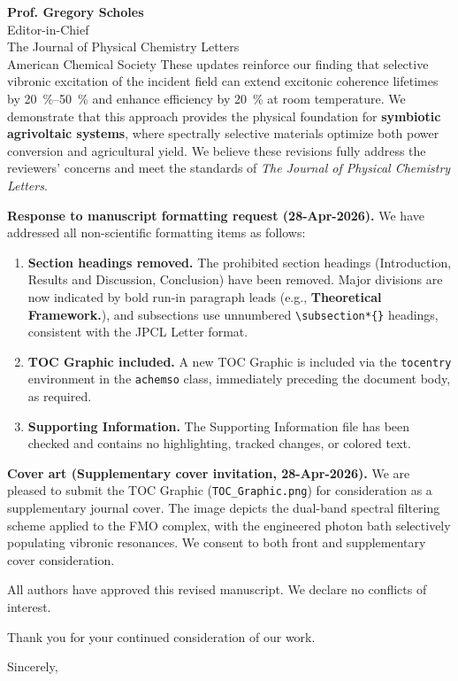 \documentclass[11pt,a4paper]{letter}
\begin{document}
\begin{letter}{
\textbf{Prof. Gregory Scholes}\\
Editor-in-Chief\\
The Journal of Physical Chemistry Letters\\
American Chemical Society
}
These updates reinforce our finding that selective vibronic excitation of the incident field can extend excitonic coherence lifetimes by \SIrange{20}{50}{\percent} and enhance efficiency by \SI{20}{\percent} at room temperature. We demonstrate that this approach provides the physical foundation for \textbf{symbiotic agrivoltaic systems}, where spectrally selective materials optimize both power conversion and agricultural yield. We believe these revisions fully address the reviewers' concerns and meet the standards of \textit{The Journal of Physical Chemistry Letters}.

\textbf{Response to manuscript formatting request (28-Apr-2026).}
We have addressed all non-scientific formatting items as follows:
\begin{enumerate}
\item \textbf{Section headings removed.} The prohibited section headings (Introduction, Results and Discussion, Conclusion) have been removed. Major divisions are now indicated by bold run-in paragraph leads (e.g., \textbf{Theoretical Framework.}), and subsections use unnumbered \texttt{\textbackslash subsection*\{\}} headings, consistent with the JPCL Letter format.
\item \textbf{TOC Graphic included.} A new TOC Graphic is included via the \texttt{tocentry} environment in the \texttt{achemso} class, immediately preceding the document body, as required.
\item \textbf{Supporting Information.} The Supporting Information file has been checked and contains no highlighting, tracked changes, or colored text.
\end{enumerate}

\textbf{Cover art (Supplementary cover invitation, 28-Apr-2026).}
We are pleased to submit the TOC Graphic (\texttt{TOC\_Graphic.png}) for consideration as a supplementary journal cover. The image depicts the dual-band spectral filtering scheme applied to the FMO complex, with the engineered photon bath selectively populating vibronic resonances. We consent to both front and supplementary cover consideration.

All authors have approved this revised manuscript. We declare no conflicts of interest.

Thank you for your continued consideration of our work.

\closing{Sincerely,}


\end{letter}
\end{document}
